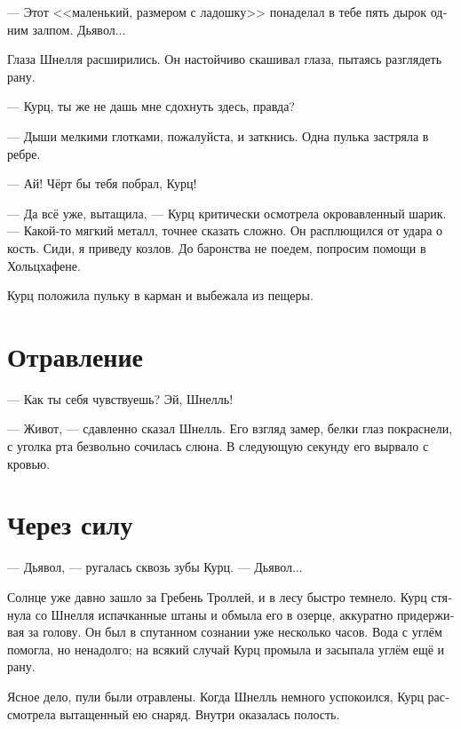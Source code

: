 \documentclass[a4paper,12pt,fleqn]{book}\usepackage{polyglossia}\setdefaultlanguage[babelshorthands=true]{russian}\setotherlanguage{english}\defaultfontfeatures{Ligatures=TeX,Mapping=tex-text}\usepackage{xcolor}\newcommand{\ml}[3]{#2}
\begin{document}
\ml{$0$}
{--- Этот <<маленький, размером с ладошку>> понаделал в тебе пять дырок одним залпом.}
{``That `tiny like that, hand-sized' stuff has made five holes in you at once.}
\ml{$0$}
{Дьявол...}
{Teufel ....''}

Глаза Шнелля расширились.
Он настойчиво скашивал глаза, пытаясь разглядеть рану.

\ml{$0$}
{--- Курц, ты же не дашь мне сдохнуть здесь, правда?}
{``Kurz, you wouldn't let me die here, would you?''}

\ml{$0$}
{--- Дыши мелкими глотками, пожалуйста, и заткнись.}
{``Take shallow breaths, please, and keep your mouth shut.}
\ml{$0$}
{Одна пулька застряла в ребре.}
{One bullet stuck in your rib.''}

\ml{$0$}
{--- Ай!}
{``Ouch!}
\ml{$0$}
{Чёрт бы тебя побрал, Курц!}
{Fuck yourself, Kurz!''}

--- Да всё уже, вытащила, --- Курц критически осмотрела окровавленный шарик.
--- Какой-то мягкий металл, точнее сказать сложно.
Он расплющился от удара о кость.
Сиди, я приведу козлов.
До баронства не поедем, попросим помощи в Хольцхафене.

Курц положила пульку в карман и выбежала из пещеры.

\section{Отравление}

\ml{$0$}
{--- Как ты себя чувствуешь?}
{``How do you feeling?}
Эй, Шнелль!

--- Живот, --- сдавленно сказал Шнелль.
Его взгляд замер, белки глаз покраснели, с уголка рта безвольно сочилась слюна.
В следующую секунду его вырвало с кровью.

\section{Через силу}

--- Дьявол, --- ругалась сквозь зубы Курц.
--- Дьявол...

Солнце уже давно зашло за Гребень Троллей, и в лесу быстро темнело.
Курц стянула со Шнелля испачканные штаны и обмыла его в озерце, аккуратно придерживая за голову.
Он был в спутанном сознании уже несколько часов.
Вода с углём помогла, но ненадолго;
на всякий случай Курц промыла и засыпала углём ещё и рану.

Ясное дело, пули были отравлены.
Когда Шнелль немного успокоился, Курц рассмотрела вытащенный ею снаряд.
Внутри оказалась полость.
\end{document}
